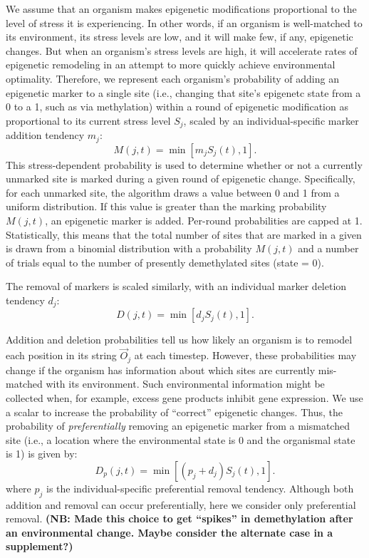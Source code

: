 \documentclass{article}
\begin{document}
We assume that an organism makes epigenetic modifications proportional to the level of stress it is experiencing. In other words, if an organism is well-matched to its environment, its stress levels are low, and it will make few, if any, epigenetic changes. But when an organism's stress levels are high, it will accelerate rates of epigenetic remodeling in an attempt to more quickly achieve environmental optimality. Therefore, we represent each organism's probability of adding an epigenetic marker to a single site (i.e., changing that site's epigenetc state from a 0 to a 1, such as via methylation) within a round of epigenetic modification as proportional to its current stress level $S_j$, scaled by an individual-specific marker addition tendency $m_j$:
\begin{equation}
    M(j,t) = \min\left[m_jS_j(t),1\right].
\end{equation}
This stress-dependent probability is used to determine whether or not a currently unmarked site is marked during a given round of epigenetic change. Specifically, for each unmarked site, the algorithm draws a value between 0 and 1 from a uniform distribution. If this value is greater than the marking probability $M(j,t)$, an epigenetic marker is added. Per-round probabilities are capped at 1. Statistically, this means that the total number of sites that are marked in a given is drawn from a binomial distribution with a probability $M(j,t)$ and a number of trials equal to the number of presently demethylated sites (state = 0). 

The removal of markers is scaled similarly, with an individual marker deletion tendency $d_j$:
\begin{equation}
    D(j,t) = \min \left[d_jS_j(t),1 \right].
\end{equation}

Addition and deletion probabilities tell us how likely an organism is to remodel each position in its string $\vec{O}_j$ at each timestep. However, these probabilities may change if the organism has information about which sites are currently mis-matched with its environment. Such environmental information might be collected when, for example, excess gene products inhibit gene expression. %
We use a scalar to increase the probability of ``correct'' epigenetic changes. Thus, the probability of \textit{preferentially} removing an epigenetic marker from a mismatched site (i.e., a location where the environmental state is 0 and the organismal state is 1) is given by:
\begin{equation}
    D_p(j,t) = \min\left[(p_j+d_j)S_j(t),1\right].
\end{equation}
where $p_j$ is the individual-specific preferential removal tendency. Although both addition and removal can occur preferentially, here we consider only preferential removal. \textbf{(NB: Made this choice to get ``spikes'' in demethylation after an environmental change. Maybe consider the alternate case in a supplement?)}
\end{document}
